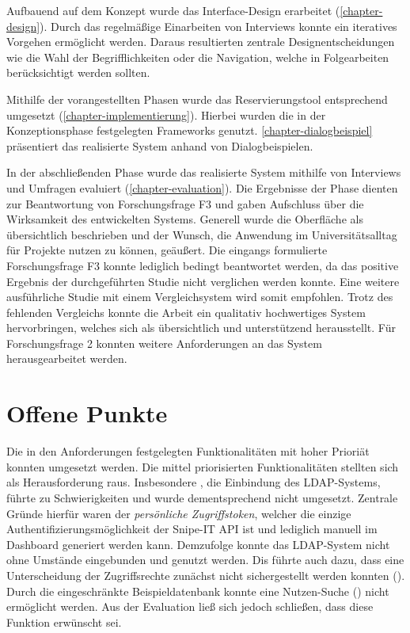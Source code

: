 Aufbauend auf dem Konzept wurde das Interface-Design erarbeitet
(\ref{chapter-design}). Durch das regelmäßige Einarbeiten von Interviews konnte
ein iteratives Vorgehen ermöglicht werden. Daraus resultierten zentrale
Designentscheidungen wie die Wahl der Begrifflichkeiten oder die Navigation, welche in
Folgearbeiten berücksichtigt werden sollten.

Mithilfe der vorangestellten Phasen wurde das Reservierungstool entsprechend
umgesetzt (\ref{chapter-implementierung}). Hierbei wurden die in der
Konzeptionsphase festgelegten Frameworks genutzt. \ref{chapter-dialogbeispiel}
präsentiert das realisierte System anhand von Dialogbeispielen.

In der abschließenden Phase wurde das realisierte System mithilfe von Interviews
und Umfragen evaluiert (\ref{chapter-evaluation}). Die Ergebnisse der Phase
dienten zur Beantwortung von Forschungsfrage F3 und gaben Aufschluss über die
Wirksamkeit des entwickelten Systems. Generell wurde die Oberfläche als
übersichtlich beschrieben und der Wunsch, die Anwendung im Universitätsalltag
für Projekte nutzen zu können, geäußert. Die eingangs formulierte Forschungsfrage
F3 konnte lediglich bedingt beantwortet werden, da das positive Ergebnis der
durchgeführten Studie nicht verglichen werden konnte. Eine weitere ausführliche
Studie mit einem Vergleichsystem wird somit empfohlen. Trotz des fehlenden
Vergleichs konnte die Arbeit ein qualitativ hochwertiges System hervorbringen,
welches sich als übersichtlich und unterstützend herausstellt. Für
Forschungsfrage 2 konnten weitere Anforderungen an das System herausgearbeitet
werden.

\section{Offene Punkte}
\label{sec:punkte}
Die in den Anforderungen festgelegten Funktionalitäten mit hoher Prioriät
konnten umgesetzt werden. Die mittel priorisierten Funktionalitäten stellten
sich als Herausforderung raus. Insbesondere , die Einbindung des
LDAP-Systems, führte zu Schwierigkeiten und wurde dementsprechend nicht
umgesetzt. Zentrale Gründe hierfür waren der \textit{persönliche
    Zugriffstoken}, welcher die einzige Authentifizierungsmöglichkeit der Snipe-IT
API ist und lediglich manuell im Dashboard generiert werden kann. Demzufolge
konnte das LDAP-System nicht ohne Umstände eingebunden und genutzt
werden. Dis führte auch dazu, dass eine Unterscheidung der Zugriffsrechte
zunächst nicht sichergestellt werden konnten (). Durch die
eingeschränkte Beispieldatenbank konnte eine Nutzen-Suche () nicht
ermöglicht werden. Aus der Evaluation ließ sich jedoch schließen, dass diese
Funktion erwünscht sei.

